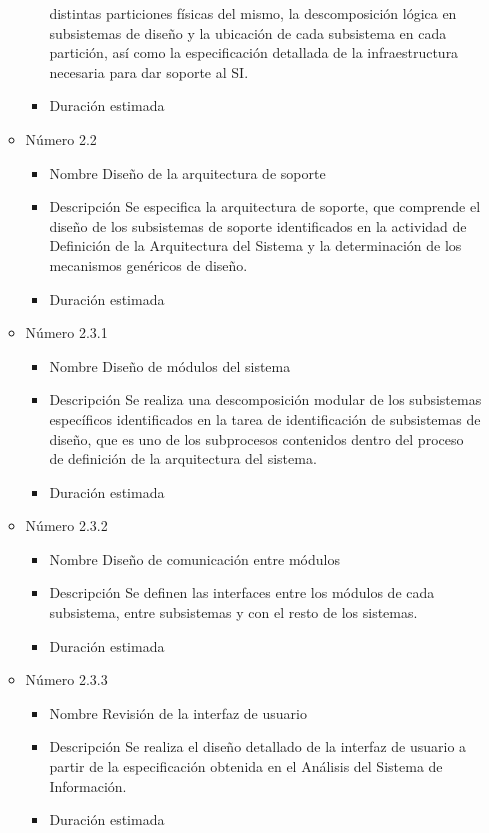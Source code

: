 \documentclass[11pt,a4paper,spanish,twoside]{report}
\begin{document}
\begin{itemize}
\begin{itemize}
\begin{itemize}
distintas particiones físicas del mismo, la descomposición lógica en 
subsistemas de diseño y la ubicación de cada subsistema en cada partición, así 
como la especificación detallada de la infraestructura necesaria para dar 
soporte al SI.
\item{Duración estimada} 
\end{itemize}
\item{Número} 2.2
\begin{itemize}
\item{Nombre} Diseño de la arquitectura de soporte
\item{Descripción} Se especifica la arquitectura de soporte, que comprende el 
diseño de los subsistemas de soporte identificados en la actividad de 
Definición de la Arquitectura del Sistema y la determinación de los mecanismos 
genéricos de diseño.
\item{Duración estimada} 
\end{itemize}
\item{Número} 2.3.1
\begin{itemize}
\item{Nombre} Diseño de módulos del sistema
\item{Descripción} Se realiza una descomposición modular de los subsistemas 
específicos identificados en la tarea de identificación de subsistemas de 
diseño, que es uno de los subprocesos contenidos dentro del proceso de 
definición de la arquitectura del sistema.
\item{Duración estimada} 
\end{itemize}
\item{Número} 2.3.2
\begin{itemize}
\item{Nombre} Diseño de comunicación entre módulos
\item{Descripción} Se definen las interfaces entre los módulos de cada 
subsistema, entre subsistemas y con el resto de los sistemas.
\item{Duración estimada} 
\end{itemize}
\item{Número} 2.3.3
\begin{itemize}
\item{Nombre} Revisión de la interfaz de usuario
\item{Descripción} Se realiza el diseño detallado de la interfaz de usuario a 
partir de la especificación obtenida en el Análisis del Sistema de Información.
\item{Duración estimada} 
\end{itemize}

\end{itemize}
\end{itemize}
\end{document}
